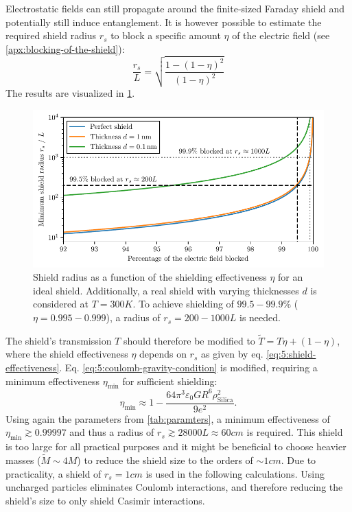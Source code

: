 Electrostatic fields can still propagate around the finite-sized Faraday shield and potentially still induce entanglement.
It is however possible to estimate the required shield radius $r_s$ to block a specific amount $\eta$ of the electric field (see \cref{apx:blocking-of-the-shield}):
\begin{equation}\label{eq:5:shield-effectiveness}
  \frac{r_s}{L} = \sqrt{\frac{1-(1-\eta)^2}{(1-\eta)^2}}
\end{equation}
The results are visualized in \cref{fig:5:shield-radius}.
\begin{figure}[!ht]
  \centering
  \includegraphics[width=\textwidth]{./../figures/others/shield-radius.pdf}
  \caption{Shield radius as a function of the shielding effectiveness $\eta$ for an ideal shield. Additionally, a real shield with varying thicknesses $d$ is considered at $T=300\si{K}$.
  To achieve shielding of $99.5-99.9\%$ ($\eta = 0.995-0.999$), a radius of $r_s =200-1000L$ is needed.}
  \label{fig:5:shield-radius}
\end{figure}
The shield's transmission $T$ should therefore be modified to $\tilde{T} = T\eta + (1-\eta)$, where the shield effectiveness $\eta$ depends on $r_s$ as given by eq. \eqref{eq:5:shield-effectiveness}.
Eq. \eqref{eq:5:coulomb-gravity-condition} is modified, requiring a minimum effectiveness $\eta_\mathrm{min}$ for sufficient shielding:
\begin{equation}
  \eta_\mathrm{min} \approx 1 - \frac{64\pi^3 \varepsilon_0 G R^6 \rho^2_\mathrm{Silica}}{9 e^2} .
\end{equation}
Using again the parameters from \cref{tab:paramters}, a minimum effectiveness of $\eta_\mathrm{min} \gtrsim 0.99997$ and thus a radius of $r_s \gtrsim 28000 L \approx 60\si{cm}$ is required.
This shield is too large for all practical purposes and it might be beneficial to choose heavier masses ($\tilde{M} \sim 4 M$) to reduce the shield size to the orders of $\sim 1\si{cm}$.
Due to practicality, a shield of $r_s = 1\si{cm}$ is used in the following calculations.
Using uncharged particles eliminates Coulomb interactions, and therefore reducing the shield's size to only shield Casimir interactions.




